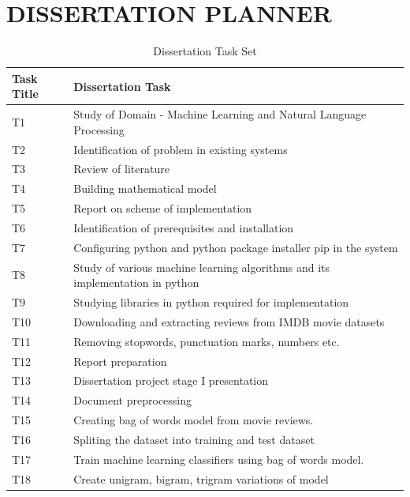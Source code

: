 \documentclass[oneside,a4paper,12pt]{pictreport}
\begin{document}
\chapter{DISSERTATION PLANNER}
\renewcommand{\arraystretch}{1.5}
\begin{table}[]
\centering
\caption{Dissertation Task Set}
\label{my-label}
\begin{tabular}{|l|l|}
\hline
\textbf{Task Title} & \textbf{Dissertation Task}                    \\ \hline
T1                  & Study of Domain - Machine Learning and Natural Language Processing         \\ \hline
T2                  & Identification of problem in existing systems \\ \hline
T3                  & Review of literature \\ 
\hline
T4                  & Building mathematical model \\ 
\hline
T5                  & Report on scheme of implementation \\ \hline
T6                  & Identification of prerequisites and installation \\ \hline
T7                  & Configuring python and python package installer pip in the system \\ \hline
T8                  & Study of various machine learning algorithms and its implementation in python\\ \hline
T9                  & Studying libraries in python required for implementation \\ \hline
T10                  & Downloading and extracting reviews from IMDB movie datasets \\ \hline
T11                  & Removing stopwords, punctuation marks, numbers etc.\\ \hline
T12                  & Report preparation \\ \hline
T13                  & Dissertation project stage I presentation \\ \hline
T14                  & Document preprocessing
 \\ \hline
T15                  & Creating bag of words model from movie reviews.
 \\ \hline
T16                  & Spliting the dataset into training and test dataset \\ \hline
T17                  & Train machine learning classifiers using bag of words model.\\ \hline
T18                  & Create unigram, bigram, trigram variations of model \\ \hline

\end{tabular}
\end{table}
\end{document}
